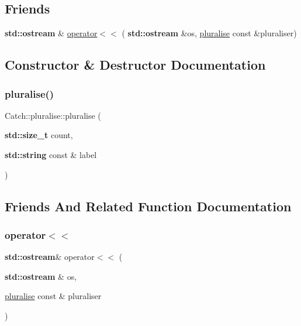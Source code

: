 \subsection*{Friends}
\begin{DoxyCompactItemize}
\item 
\textbf{ std\+::ostream} \& \hyperlink{struct_catch_1_1pluralise_aa7dac6b165514c1f85e0695d678fdef5}{operator$<$$<$} (\textbf{ std\+::ostream} \&os, \hyperlink{struct_catch_1_1pluralise}{pluralise} const \&pluraliser)
\end{DoxyCompactItemize}


\subsection{Constructor \& Destructor Documentation}
\mbox{\label{struct_catch_1_1pluralise_a5c55e22de2416cfe416edf715c6b9234}} 
\subsubsection{\texorpdfstring{pluralise()}{pluralise()}}
{\footnotesize\ttfamily Catch\+::pluralise\+::pluralise (\begin{DoxyParamCaption}\item[{\textbf{ std\+::size\+\_\+t}}]{count,  }\item[{\textbf{ std\+::string} const \&}]{label }\end{DoxyParamCaption})}



\subsection{Friends And Related Function Documentation}
\mbox{\label{struct_catch_1_1pluralise_aa7dac6b165514c1f85e0695d678fdef5}} 
\subsubsection{\texorpdfstring{operator$<$$<$}{operator<<}}
{\footnotesize\ttfamily \textbf{ std\+::ostream}\& operator$<$$<$ (\begin{DoxyParamCaption}\item[{\textbf{ std\+::ostream} \&}]{os,  }\item[{\hyperlink{struct_catch_1_1pluralise}{pluralise} const \&}]{pluraliser }\end{DoxyParamCaption})\hspace{0.3cm}{\ttfamily [friend]}}




